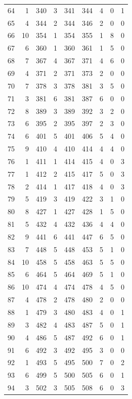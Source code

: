 \begin{longtable}{@{}rrrrrrrrr@{}}
64 & 1 & 340 & 3 & 341 & 344 & 4 & 0 & 1 \\
65 & 4 & 344 & 2 & 344 & 346 & 2 & 0 & 0 \\
66 & 10 & 354 & 1 & 354 & 355 & 1 & 8 & 0 \\
67 & 6 & 360 & 1 & 360 & 361 & 1 & 5 & 0 \\
68 & 7 & 367 & 4 & 367 & 371 & 4 & 6 & 0 \\
69 & 4 & 371 & 2 & 371 & 373 & 2 & 0 & 0 \\
70 & 7 & 378 & 3 & 378 & 381 & 3 & 5 & 0 \\
71 & 3 & 381 & 6 & 381 & 387 & 6 & 0 & 0 \\
72 & 8 & 389 & 3 & 389 & 392 & 3 & 2 & 0 \\
73 & 6 & 395 & 2 & 395 & 397 & 2 & 3 & 0 \\
74 & 6 & 401 & 5 & 401 & 406 & 5 & 4 & 0 \\
75 & 9 & 410 & 4 & 410 & 414 & 4 & 4 & 0 \\
76 & 1 & 411 & 1 & 414 & 415 & 4 & 0 & 3 \\
77 & 1 & 412 & 2 & 415 & 417 & 5 & 0 & 3 \\
78 & 2 & 414 & 1 & 417 & 418 & 4 & 0 & 3 \\
79 & 5 & 419 & 3 & 419 & 422 & 3 & 1 & 0 \\
80 & 8 & 427 & 1 & 427 & 428 & 1 & 5 & 0 \\
81 & 5 & 432 & 4 & 432 & 436 & 4 & 4 & 0 \\
82 & 9 & 441 & 6 & 441 & 447 & 6 & 5 & 0 \\
83 & 7 & 448 & 5 & 448 & 453 & 5 & 1 & 0 \\
84 & 10 & 458 & 5 & 458 & 463 & 5 & 5 & 0 \\
85 & 6 & 464 & 5 & 464 & 469 & 5 & 1 & 0 \\
86 & 10 & 474 & 4 & 474 & 478 & 4 & 5 & 0 \\
87 & 4 & 478 & 2 & 478 & 480 & 2 & 0 & 0 \\
88 & 1 & 479 & 3 & 480 & 483 & 4 & 0 & 1 \\
89 & 3 & 482 & 4 & 483 & 487 & 5 & 0 & 1 \\
90 & 4 & 486 & 5 & 487 & 492 & 6 & 0 & 1 \\
91 & 6 & 492 & 3 & 492 & 495 & 3 & 0 & 0 \\
92 & 1 & 493 & 5 & 495 & 500 & 7 & 0 & 2 \\
93 & 6 & 499 & 5 & 500 & 505 & 6 & 0 & 1 \\
94 & 3 & 502 & 3 & 505 & 508 & 6 & 0 & 3 \\

\end{longtable}
